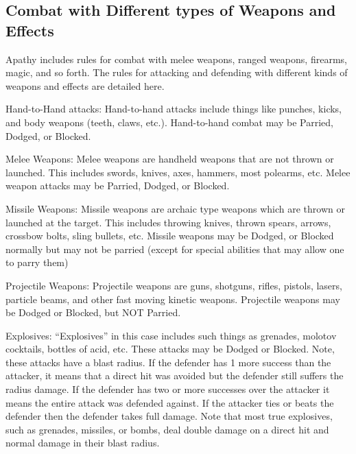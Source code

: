 \documentclass[twoside]{book}
\begin{document}
\subsection{Combat with Different types of Weapons and Effects}
     Apathy includes rules for combat with melee weapons,
               ranged weapons, firearms, magic, and so forth. The rules
               for attacking and defending with different kinds of
               weapons and effects are detailed here.   
              
                 Hand-to-Hand attacks:   
                  Hand-to-hand attacks include things like punches,
                 kicks, and body weapons (teeth, claws, etc.).
                 Hand-to-hand combat may be Parried, Dodged, or Blocked.
                 
                
              
                 Melee Weapons:   
                  Melee weapons are handheld weapons that are not
                 thrown or launched. This includes swords, knives, axes,
                 hammers, most polearms, etc. Melee weapon attacks may be
                 Parried, Dodged, or Blocked. 
                
              
                 Missile Weapons:   
                  Missile weapons are archaic type weapons which
                 are thrown or launched at the target. This includes
                 throwing knives, thrown spears, arrows, crossbow bolts,
                 sling bullets, etc. Missile weapons may be Dodged, or
                 Blocked normally but may not be parried (except for
                 special abilities that may allow one to parry them)
                 
                
              
                 Projectile Weapons:   
                  Projectile weapons are guns, shotguns, rifles,
                 pistols, lasers, particle beams, and other fast moving
                 kinetic weapons. Projectile weapons may be Dodged or
                 Blocked, but NOT Parried. 
                
              
                 Explosives:   
                  “Explosives” in this case includes
                 such things as grenades, molotov cocktails, bottles of
                 acid, etc. These attacks may be Dodged or Blocked. Note,
                 these attacks have a blast radius. If the defender has 1
                 more success than the attacker, it means that a direct
                 hit was avoided but the defender still suffers the
                 radius damage. If the defender has two or more successes
                 over the attacker it means the entire attack was
                 defended against. If the attacker ties or beats the
                 defender then the defender takes full damage. Note that
                 most true explosives, such as grenades, missiles, or
                 bombs, deal double damage on a direct hit and normal
                 damage in their blast radius. 
                
\end{document}
